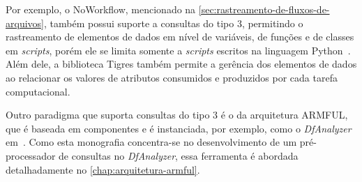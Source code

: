 Por exemplo, o NoWorkflow, mencionado na \autoref{sec:rastreamento-de-fluxos-de-arquivos}, também possui suporte a consultas do tipo 3, permitindo o rastreamento de elementos de dados em nível de variáveis, de funções e de classes em \textit{scripts}, porém ele se limita somente a \textit{scripts} escritos na linguagem Python~\cite{murta2014noworkflow}. Além dele, a biblioteca Tigres também permite a gerência dos elementos de dados ao relacionar os valores de atributos consumidos e produzidos por cada tarefa computacional.

Outro paradigma que suporta consultas do tipo 3 é o da arquitetura ARMFUL, que é baseada em componentes e é instanciada, por exemplo, como o \textit{DfAnalyzer} em~\cite{silva2017raw}. Como esta monografia concentra-se no desenvolvimento de um pré-processador de consultas no \textit{DfAnalyzer}, essa ferramenta é abordada detalhadamente no \autoref{chap:arquitetura-armful}.